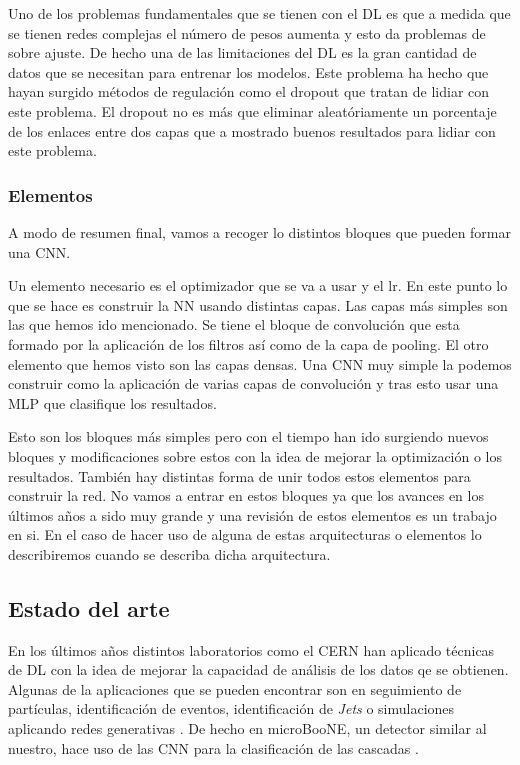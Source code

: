 \documentclass[a4paper,12pt,twoside,titlepage]{article}
\begin{document}
Uno de los problemas fundamentales que se tienen con el DL es que a medida que se tienen redes complejas el número de pesos aumenta y esto da problemas de sobre ajuste. De hecho una de las limitaciones del DL es la gran cantidad de datos que se necesitan para entrenar los modelos. Este problema ha hecho que hayan surgido métodos de regulación como el dropout que tratan de lidiar con este problema. El dropout no es más que eliminar aleatóriamente un porcentaje de los enlaces entre dos capas que a mostrado buenos resultados para lidiar con este problema.

\subsubsection*{Elementos}

A modo de resumen final, vamos a recoger lo distintos bloques que pueden formar una CNN.

Un elemento necesario es el optimizador que se va a usar y el lr. En este punto lo que se hace es construir la NN usando distintas capas. Las capas más simples son las que hemos ido mencionado. Se tiene el bloque de convolución que esta formado por la aplicación de los filtros así como de la capa de pooling. El otro elemento que hemos visto son las capas densas. Una CNN muy simple la podemos construir como la aplicación de varias capas de convolución y tras esto usar una MLP que clasifique los resultados.

Esto son los bloques más simples pero con el tiempo han ido surgiendo nuevos bloques y modificaciones sobre estos con la idea de mejorar la optimización o los resultados. También hay distintas forma de unir todos estos elementos para construir la red. No vamos a entrar en estos bloques ya que los avances en los últimos años a sido muy grande y una revisión de estos elementos es un trabajo en si. En el caso de hacer uso de alguna de estas arquitecturas o elementos lo describiremos cuando se describa dicha arquitectura.

\subsection{Estado del arte}

En los últimos años distintos laboratorios como el CERN han aplicado técnicas de DL \cite{ml_phy} con la idea de mejorar la capacidad de análisis de los datos qe se obtienen. Algunas de la aplicaciones que se pueden encontrar son en seguimiento de partículas, identificación de eventos, identificación de \textit{Jets} o simulaciones aplicando redes generativas \cite{dl_phy, dl_lhc}. De hecho en microBooNE, un detector similar al nuestro, hace uso de las CNN para la clasificación de las cascadas \cite{ml_phy}.
\end{document}
